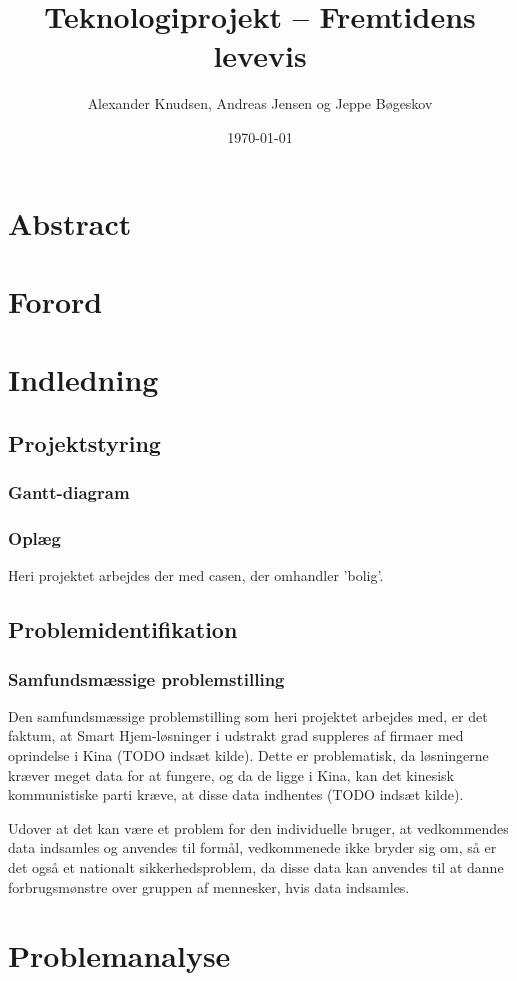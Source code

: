 \documentclass[11pt]{article}
\author{Alexander Knudsen, Andreas Jensen og Jeppe Bøgeskov}
\date{\today}
\title{Teknologiprojekt -- Fremtidens levevis}
\begin{document}


\restoregeometry
\tableofcontents
\newpage
\section{Abstract}
\label{sec:orgb9c23e5}
\section{Forord}
\label{sec:orgc2214df}
\section{Indledning}
\label{sec:org371958f}
\subsection{Projektstyring}
\label{sec:orgff87971}
\subsubsection{Gantt-diagram}
\label{sec:orgdc0c31b}
\subsubsection{Oplæg}
\label{sec:orgacd79b4}
Heri projektet arbejdes der med casen, der omhandler 'bolig'.
\subsection{Problemidentifikation}
\label{sec:orgbbc5899}
\subsubsection{Samfundsmæssige problemstilling}
\label{sec:org23b9d5b}
Den samfundsmæssige problemstilling som heri projektet arbejdes med, er det faktum, at Smart Hjem-løsninger i udstrakt grad suppleres af firmaer med oprindelse i Kina (TODO indsæt kilde). Dette er problematisk, da løsningerne kræver meget data for at fungere, og da de ligge i Kina, kan det kinesisk kommunistiske parti kræve, at disse data indhentes (TODO indsæt kilde).

Udover at det kan være et problem for den individuelle bruger, at vedkommendes data indsamles og anvendes til formål, vedkommenede ikke bryder sig om, så er det også et nationalt sikkerhedsproblem, da disse data kan anvendes til at danne forbrugsmønstre over gruppen af mennesker, hvis data indsamles.
\section{Problemanalyse}
\label{sec:org6aef79d}
\end{document}
